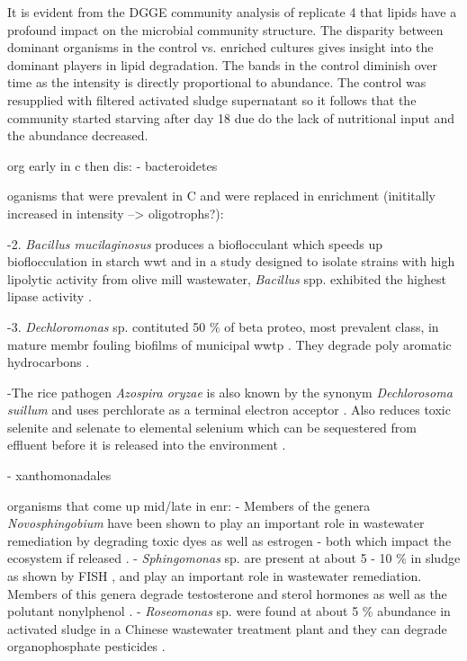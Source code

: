 \documentclass[11pt]{article}
\begin{document}
It is evident from the DGGE community analysis of replicate 4 that lipids have a profound impact on the microbial community structure. The disparity between dominant organisms in the control vs. enriched cultures gives insight into the dominant players in lipid degradation. The bands in the control diminish over time as the intensity is directly proportional to abundance. The control was resupplied with filtered activated sludge supernatant so it follows that the community started starving after day 18 due do the lack of nutritional input and the abundance decreased.

org early in c then dis:
- bacteroidetes

oganisms that were prevalent in C and were replaced in enrichment (inititally increased in intensity --> oligotrophs?):

-2. \emph{Bacillus mucilaginosus} produces a bioflocculant which speeds up bioflocculation in starch wwt \cite{deng2003characteristics} and in a study designed to isolate strains with high lipolytic activity from olive mill wastewater, \emph{Bacillus} spp. exhibited the highest lipase activity \cite{ertuugrul2007isolation}.

-3. \emph{Dechloromonas} sp. contituted 50 \% of beta proteo, most prevalent class,  in mature membr fouling biofilms of municipal wwtp \cite{miura2007membrane}. They degrade poly aromatic hydrocarbons \cite{oshiki2008pha}.

-The rice pathogen \emph{Azospira oryzae} is also known by the synonym \emph{Dechlorosoma suillum} and uses perchlorate as a terminal electron acceptor  \cite{reinhold2000reassessment,tan2003dechlorosoma}. Also reduces toxic selenite and selenate to elemental selenium which can be sequestered from effluent before it is released into the environment \cite{hunter2007azospira,wilhelmus2013microbiological}.

- xanthomonadales

organisms that come up mid/late in enr:
- Members of the genera \emph{Novosphingobium} have been shown to play an important role in wastewater remediation by degrading toxic dyes as well as estrogen - both which impact the ecosystem if released \cite{addison2007novosphingobium,hashimoto2009contribution}.
- \emph{Sphingomonas} sp. are present at about 5 - 10 \% in sludge as shown by FISH \cite{neef1999detection}, and play an important role in wastewater remediation. Members of this genera degrade testosterone and sterol hormones as well as the polutant nonylphenol \cite{fujii2001sphingomonas,roh201017beta}.
- \emph{Roseomonas} sp. were found at about 5 \% abundance in activated sludge in a Chinese wastewater treatment plant and they can degrade organophosphate pesticides \cite{jiang2008bacterial,jiang2006isolation}.
\end{document}
